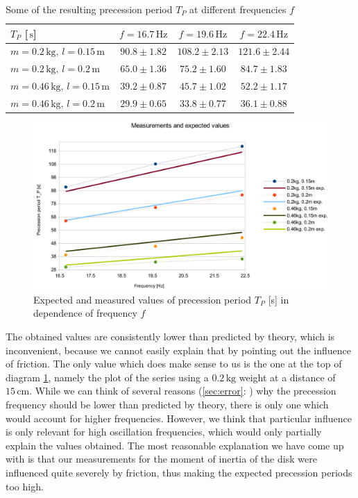 \documentclass{scrreprt}
\newcommand{\unit}[1]{\ensuremath{\, \mathrm{#1}}}
\begin{document}
\begin{table}[H]
\centering
\begin{tabular}{|l|ccc|}
\hline
$T_P$ [$\unit{s}$] & $f = 16.7 \unit{Hz}$ & $f = 19.6 \unit{Hz}$ & $f = 22.4 \unit{Hz}$\\ \hline\hline
$m=0.2\unit{kg},\, l=0.15\unit{m}$ & $90.8 \pm 1.82$ & $108.2 \pm 2.13$ & $121.6 \pm 2.44$\\
$m=0.2\unit{kg},\, l=0.2\unit{m}$ & $65.0 \pm 1.36$ & $75.2 \pm 1.60$ & $84.7 \pm 1.83$\\
$m=0.46\unit{kg},\, l=0.15\unit{m}$ & $39.2 \pm 0.87$ & $45.7 \pm 1.02$ & $52.2 \pm 1.17$\\
$m=0.46\unit{kg},\, l=0.2\unit{m}$ & $29.9 \pm 0.65$ & $33.8 \pm 0.77$ & $36.1 \pm 0.88$\\ \hline

\end{tabular}
\label{tab:period_results}
\caption{Some of the resulting precession period $T_P$ at different frequencies $f$}
\end{table}

\begin{figure}[H]
	\centering
  \includegraphics[width=1.0\textwidth]{diag/meas_exp_crop.pdf}
	\caption{Expected and measured values of precession period $T_P$ [s] in dependence of frequency $f$}
	\label{diag:meas_exp}
\end{figure}

The obtained values are consistently lower than predicted by theory, which is inconvenient, because we cannot easily explain that by pointing out the influence of friction. The only value which does make sense to us is the one at the top of diagram \ref{diag:meas_exp}, namely the plot of the series using a $0.2 \unit{kg}$ weight at a distance of $15 \unit{cm}$. While we can think of several reasons (\ref{sec:error}: ) why the precession frequency should be lower than predicted by theory, there is only one which would account for higher frequencies. However,  we think that particular influence is only relevant for high oscillation frequencies, which would only partially explain the values obtained. The most reasonable explanation we have come up with is that our measurements for the moment of inertia of the disk were influenced quite severely by friction, thus making the expected precession periods too high.
\end{document}
